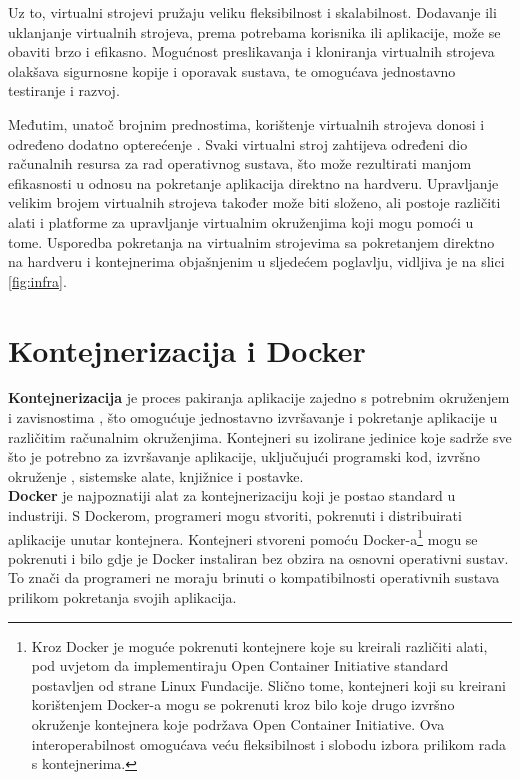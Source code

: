 \documentclass[times, utf8, diplomski]{fer}
\begin{document}
Uz to, virtualni strojevi pružaju veliku fleksibilnost i skalabilnost. Dodavanje ili uklanjanje virtualnih strojeva, prema potrebama korisnika ili aplikacije, može se obaviti brzo i efikasno. Mogućnost preslikavanja  i kloniranja virtualnih strojeva olakšava sigurnosne kopije  i oporavak sustava, te omogućava jednostavno testiranje i razvoj.

Međutim, unatoč brojnim prednostima, korištenje virtualnih strojeva donosi i određeno dodatno opterećenje . Svaki virtualni stroj zahtijeva određeni dio računalnih resursa za rad operativnog sustava, što može rezultirati manjom efikasnosti u odnosu na pokretanje aplikacija direktno na hardveru. Upravljanje velikim brojem virtualnih strojeva također može biti složeno, ali postoje različiti alati i platforme za upravljanje virtualnim okruženjima koji mogu pomoći u tome. Usporedba pokretanja na virtualnim strojevima sa pokretanjem direktno na hardveru i kontejnerima objašnjenim u sljedećem poglavlju, vidljiva je na slici \ref{fig:infra}.

\section{Kontejnerizacija i Docker}
\label{sec:docker}

\textbf{Kontejnerizacija} je proces pakiranja aplikacije zajedno s potrebnim okruženjem i zavisnostima , što omogućuje jednostavno izvršavanje i pokretanje aplikacije u različitim računalnim okruženjima. Kontejneri su izolirane jedinice koje sadrže sve što je potrebno za izvršavanje aplikacije, uključujući programski kod, izvršno okruženje , sistemske alate, knjižnice i postavke. \\

\textbf{Docker} je najpoznatiji alat za kontejnerizaciju koji je postao standard u industriji. S Dockerom, programeri mogu stvoriti, pokrenuti i distribuirati aplikacije unutar kontejnera. Kontejneri stvoreni pomoću Docker-a\footnote{Kroz Docker je moguće pokrenuti kontejnere koje su kreirali različiti alati, pod uvjetom da implementiraju Open Container Initiative standard postavljen od strane Linux Fundacije. Slično tome, kontejneri koji su kreirani korištenjem Docker-a mogu se pokrenuti kroz bilo koje drugo izvršno okruženje kontejnera koje podržava Open Container Initiative. Ova interoperabilnost omogućava veću fleksibilnost i slobodu izbora prilikom rada s kontejnerima.} mogu se pokrenuti i bilo gdje je Docker instaliran bez obzira na osnovni operativni sustav. To znači da programeri ne moraju brinuti o kompatibilnosti operativnih sustava prilikom pokretanja svojih aplikacija.
\end{document}
